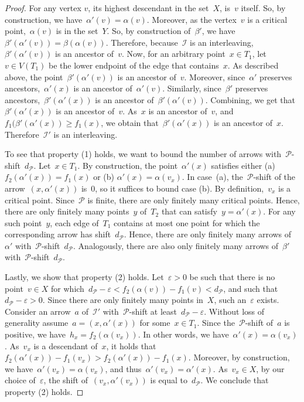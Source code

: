 \documentclass[a4paper,UKenglish, autoref, thm-restate, cleveref]{lipics-v2021}
\newcommand{\resdist}[1]{d_{#1}}
\newcommand{\eps}{\varepsilon}
\newcommand{\I}{\mathcal{I}}
\renewcommand{\P}{\mathcal{P}}
\begin{document}
\begin{proof}
\proofsubparagraph{$\I'$ is an interleaving.}
For any vertex $v$, its highest descendant in the set~$X$, is~$v$ itself.
So, by construction, we have~$\alpha'(v) = \alpha(v)$.
Moreover, as the vertex~$v$ is a critical point,~$\alpha(v)$ is in the set~$Y$.
So, by construction of~$\beta'$, we have~$\beta'(\alpha'(v)) = \beta(\alpha(v))$.
Therefore, because~$\I$ is an interleaving,~$\beta'(\alpha'(v))$ is an ancestor of~$v$.
Now, for an arbitrary point~$x \in T_1$, let~$v \in V(T_1)$ be the lower endpoint of the edge that contains~$x$.
As described above, the point~$\beta'(\alpha'(v))$ is an ancestor of~$v$.
Moreover, since~$\alpha'$ preserves ancestors,~$\alpha'(x)$ is an ancestor of~$\alpha'(v)$.
Similarly, since~$\beta'$ preserves ancestors,~$\beta'(\alpha'(x))$ is an ancestor of~$\beta'(\alpha'(v))$.
Combining, we get that~$\beta'(\alpha'(x))$ is an ancestor of~$v$.
As~$x$ is an ancestor of~$v$, and~$f_1(\beta'(\alpha'(x)) \ge f_1(x)$, we obtain that~$\beta'(\alpha'(x))$ is an ancestor of~$x$.
Therefore~$\I'$ is an interleaving.

\proofsubparagraph{$\I'$ is isolated.}
To see that property (1) holds, we want to bound the number of arrows with~$\P$-shift~$\resdist{\P}$.
Let~$x \in T_1$.
By construction, the point~$\alpha'(x)$ satisfies either (a) $f_2(\alpha'(x)) = f_1(x)$ or (b) $\alpha'(x) = \alpha(v_x)$.
In case~(a), the~$\P$-shift of the arrow~$(x, \alpha'(x))$ is~$0$, so it suffices to bound case (b).
By definition,~$v_x$ is a critical point.
Since~$\P$ is finite, there are only finitely many critical points.
Hence, there are only finitely many points~$y$ of~$T_2$ that can satisfy~$y = \alpha'(x)$.
For any such point~$y$, each edge of~$T_1$ contains at most one point for which the corresponding arrow has shift~$\resdist{\P}$.
Hence, there are only finitely many arrows of~$\alpha'$ with~$\P$-shift~$\resdist{\P}$.
Analogously, there are also only finitely many arrows of~$\beta'$ with~$\P$-shift~$\resdist{\P}$.

Lastly, we show that property (2) holds.
Let~$\eps > 0$ be such that there is no point~$v \in X$ for which~$\resdist{\P} - \eps < f_2(\alpha(v)) - f_1(v) < \resdist{\P}$, and such that~$\resdist{\P} -\eps > 0$.
Since there are only finitely many points in~$X$, such an~$\eps$ exists.
Consider an arrow~$a$ of~$\I'$ with~$\P$-shift at least~$\resdist{\P} - \eps$.
Without loss of generality assume~$a = (x, \alpha'(x))$ for some~$x \in T_1$.
Since the~$\P$-shift of~$a$ is positive, we have~$h_x = f_2(\alpha(v_x))$.
In other words, we have~$\alpha'(x) = \alpha(v_x)$.
As~$v_x$ is a descendant of~$x$, it holds that~$f_2(\alpha'(x)) - f_1(v_x) > f_2(\alpha'(x)) - f_1(x)$.
Moreover, by construction, we have~$\alpha'(v_x) = \alpha(v_x)$, and thus~$\alpha'(v_x) = \alpha'(x)$.
As~$v_x \in X$, by our choice of~$\eps$, the shift of~$(v_x, \alpha'(v_x))$ is equal to~$\resdist{\P}$.
We conclude that property (2) holds.
\end{proof}
\end{document}
